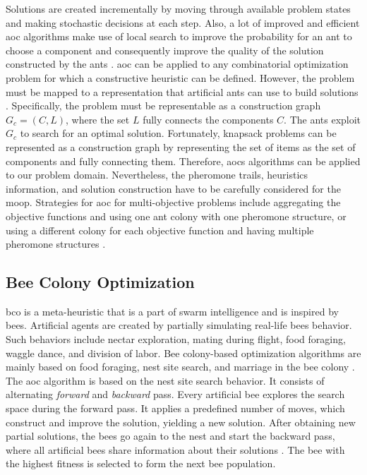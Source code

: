 Solutions are created incrementally by moving through available problem states and making stochastic decisions at each step. Also, a lot of improved and efficient \gls{aoc} algorithms make use of local search to improve the probability for an ant to choose a component and consequently improve the quality of the solution constructed by the ants \parencite{Stutzle2000MAX-MINSystem}. \Gls{aoc} can be applied to any combinatorial optimization problem for which a constructive heuristic can be defined. However, the problem must be mapped to a representation that artificial ants can use to build solutions \parencite{Dorigo2018TheMetaheuristic}. Specifically, the problem must be representable as a construction graph $G_c = (C, L)$, where the set $L$ fully connects the components $C$. The ants exploit $G_c$ to search for an optimal solution. Fortunately, knapsack problems can be represented as a construction graph by representing the set of items as the set of components and fully connecting them. Therefore, \glspl{aoc} algorithms can be applied to our problem domain. Nevertheless, the pheromone trails, heuristics information, and solution construction have to be carefully considered for the \gls{moop}. Strategies for \gls{aoc} for multi-objective problems include aggregating the objective functions and using one ant colony with one pheromone structure, or using a different colony for each objective function and having multiple pheromone structures \parencite{Alaya2007AntProblems}.

\subsection{Bee Colony Optimization}
\Gls{bco} is a meta-heuristic that is a part of swarm intelligence and is inspired by bees. Artificial agents are created by partially simulating real-life bees behavior. Such behaviors include nectar exploration, mating during flight, food foraging, waggle dance, and division of labor. Bee colony-based optimization algorithms are mainly based on food foraging, nest site search, and marriage in the bee colony \parencite{Talbi2009Metaheuristics:Implementation}.
The \gls{aoc} algorithm is based on the nest site search behavior. It consists of alternating \textit{forward} and \textit{backward} pass. Every artificial bee explores the search space during the forward pass. It applies a predefined number of moves, which construct and improve the solution, yielding a new solution. After obtaining new partial solutions, the bees go again to the nest and
start the backward pass, where all artificial
bees share information about their solutions \parencite{Teodorovic2009BeeBCO}. The bee with the highest fitness is selected to form the next bee population.


